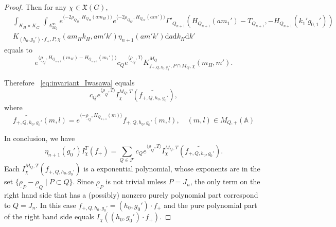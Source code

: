 \documentclass[10pt,a4paper]{amsart}
\newcommand{\bA}{\mathbb{A}}
\newcommand{\cF}{\mathcal{F}}
\newcommand{\fX}{\mathfrak{X}}
\newcommand{\rd}{\mathrm{d}}
\begin{document}
\begin{proof}
Then for any $\chi \in \fX(G)$,
 \begin{align*}
       & \int_{K_H \times K_{G'}} \int_{A_{M_Q}^\infty}
    e^{\langle -2\rho_{Q_H}, H_{Q_H}(am_H) \rangle}
    e^{\langle -2\rho_{Q_{G'}}, H_{Q_{G'}}(am') \rangle}
    \Gamma'_{Q_{n+1}}(H_{Q_{n+1}}(am_1')-T_{Q_{n+1}},
    -H_{Q_{n+1}}(k_1' g_{0,1}'))\\
    & K_{(h_0, g_0') \cdot f_+,P,\chi}(am_H k_H, am'k')
    \eta_{n+1}(am'k')  \rd a \rd k_H \rd k'
    \end{align*}
    equals to
    \[
    e^{\langle \underline{\rho}_Q, H_{Q_{n+1}}(m_H) - H_{Q_{n+1}}(m_1') \rangle} c_Q e^{ \langle \underline{\rho}_Q, T \rangle} K_{f_{+,Q,h_0,g_0'},P \cap M_Q,\chi}^{M_Q}(m_H,m').
    \]

Therefore ~\eqref{eq:invariant_Iwasawa} equals
    \[
    c_Q e^{\langle \underline{\rho}_Q,T \rangle}
    I_{\chi}^{M_Q,T}(\widetilde{f_{+, Q, h_0, g_0'}}),
    \]
where
    \[
       \widetilde{f_{+,Q,h_0,g_0'}}(m,l)= e^{ \langle -\underline{\rho}_Q,
    H_{Q_{n+1}}(m)\rangle} f_{+,Q,h_0,g_0'}(m,l), \quad (m, l) \in M_{Q, +}(\bA)
    \]

In conclusion, we have
    \[
    \eta_{n+1}(g_0') I_\chi^{T}(f_+) = \sum_{Q \in \cF}
    c_Q  e^{\langle \underline{\rho}_Q, T \rangle}
    I_{\chi}^{M_Q,T}(\widetilde{f_{+, Q, h_0, g_0'}}).
    \]
Each $I_{\chi}^{M_Q,T}(f_{+, Q, h_0, g_0'})$ is a exponential polynomial,
whose exponents are in the set $\{\underline{\rho}_P - \underline{\rho}_Q
\mid P \subset Q \}$. Since $\underline{\rho}_P$ is not trivial unless
$P = J_n$, the only term on the right hand side
that has a (possibly) nonzero purely polynomial part correspond to $Q =
J_n$. In this case $f_{+, Q, h_0, g_0'} = (h_0, g_0') \cdot f_+$ and
the pure polynomial part of the right hand side equals
$I_\chi((h_0, g_0') \cdot f_+)$.
\end{proof}
\end{document}
